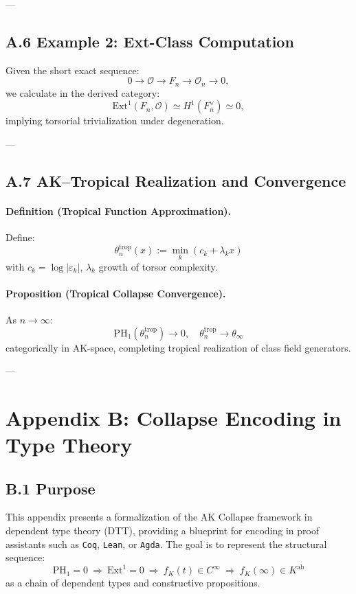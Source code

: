\documentclass[11pt]{article}
\begin{document}
---

\subsection*{A.6 Example 2: Ext-Class Computation}

Given the short exact sequence:
\[
0 \to \mathcal{O} \to F_n \to \mathcal{O}_n \to 0,
\]
we calculate in the derived category:
\[
\mathrm{Ext}^1(F_n, \mathcal{O}) \simeq H^1(F_n^\vee) \simeq 0,
\]
implying torsorial trivialization under degeneration.

---

\subsection*{A.7 AK–Tropical Realization and Convergence}

\paragraph{Definition (Tropical Function Approximation).}
Define:
\[
\theta_n^{\mathrm{trop}}(x) := \min_k (c_k + \lambda_k x)
\]
with \( c_k = \log|\varepsilon_k| \), \( \lambda_k \) growth of torsor complexity.

\paragraph{Proposition (Tropical Collapse Convergence).}
As \( n \to \infty \):
\[
\mathrm{PH}_1(\theta_n^{\mathrm{trop}}) \to 0,\quad \theta_n^{\mathrm{trop}} \to \theta_\infty
\]
categorically in AK-space, completing tropical realization of class field generators.


---


\section*{Appendix B: Collapse Encoding in Type Theory}

\subsection*{B.1 Purpose}

This appendix presents a formalization of the AK Collapse framework in dependent type theory (DTT),  
providing a blueprint for encoding in proof assistants such as \texttt{Coq}, \texttt{Lean}, or \texttt{Agda}.  
The goal is to represent the structural sequence:
\[
\mathrm{PH}_1 = 0 \ \Rightarrow\ \mathrm{Ext}^1 = 0 \ \Rightarrow\ f_K(t) \in C^\infty \ \Rightarrow\ f_K(\infty) \in K^{\mathrm{ab}}
\]
as a chain of dependent types and constructive propositions.
\end{document}
